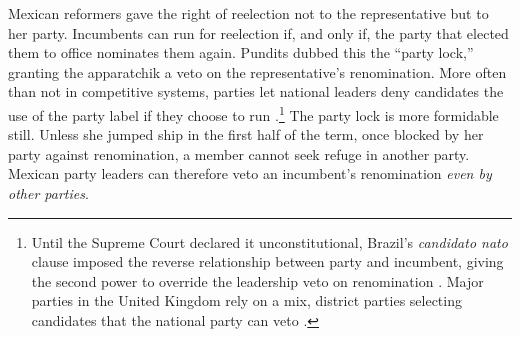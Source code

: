 \documentclass[letter,12pt]{article}
\begin{document}

Mexican reformers gave the right of reelection not to the representative but to her party. Incumbents can run for reelection if, and only if, the party that elected them to office nominates them again. Pundits dubbed this the ``party lock,'' granting the apparatchik a veto on the representative's renomination. More often than not in competitive systems, parties let national leaders deny candidates the use of the party label if they choose to run \citep[:85]{ranney.cand-sel.1981}.\footnote{Until the Supreme Court declared it unconstitutional, Brazil's \emph{candidato nato} clause imposed the reverse relationship between party and incumbent, giving the second power to override the leadership veto on renomination \citep{mainwaring.1991}. Major parties in the United Kingdom rely on a mix, district parties selecting candidates that the national party can veto \citep{mikulska.uk.cand.sel2010}.} The party lock is more formidable still. Unless she jumped ship in the first half of the term, once blocked by her party against renomination, a member cannot seek refuge in another party. Mexican party leaders can therefore veto an incumbent's renomination \emph{even by other parties}. 
\end{document}
